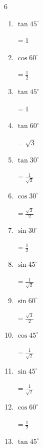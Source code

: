 \begin{multicols}{6}
\begin{enumerate}
        $\displaystyle =\frac{\sqrt{3}}{2}$

  \item $\displaystyle \tan{45^\circ}$

        $\displaystyle =1$

  \item $\displaystyle \cos{60^\circ}$

        $\displaystyle =\frac{1}{2}$

  \item $\displaystyle \tan{45^\circ}$

        $\displaystyle =1$

  \item $\displaystyle \tan{60^\circ}$

        $\displaystyle =\sqrt{3}$

  \item $\displaystyle \tan{30^\circ}$

        $\displaystyle =\frac{1}{\sqrt{3}}$

  \item $\displaystyle \cos{30^\circ}$

        $\displaystyle =\frac{\sqrt{3}}{2}$

  \item $\displaystyle \sin{30^\circ}$

        $\displaystyle =\frac{1}{2}$

  \item $\displaystyle \sin{45^\circ}$

        $\displaystyle =\frac{1}{\sqrt{2}}$

  \item $\displaystyle \sin{60^\circ}$

        $\displaystyle =\frac{\sqrt{3}}{2}$

  \item $\displaystyle \cos{45^\circ}$

        $\displaystyle =\frac{1}{\sqrt{2}}$

  \item $\displaystyle \sin{45^\circ}$

        $\displaystyle =\frac{1}{\sqrt{2}}$

  \item $\displaystyle \cos{60^\circ}$

        $\displaystyle =\frac{1}{2}$

  \item $\displaystyle \tan{45^\circ}$


\end{enumerate}
\end{multicols}
